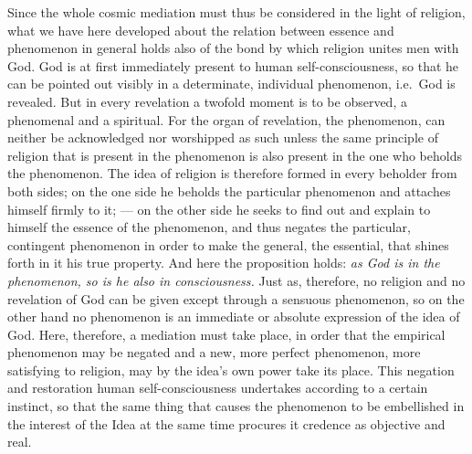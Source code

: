 \documentclass[12pt]{book}
\newcommand{\opage}[1]{\marginnote{\footnotesize\textit{[#1]}}}
\begin{document}
Since the whole cosmic mediation must thus be considered in the light of
religion, what we have here developed about the relation between essence and
phenomenon in general holds also of the bond by which religion unites men with
God. God is at first immediately present to human self-consciousness, so that
he can be pointed out visibly in a determinate, individual phenomenon, i.e.\
God is revealed. But in every revelation a twofold moment is to be observed, a
phenomenal and a spiritual. For the organ of revelation, the phenomenon, can
neither be acknowledged nor worshipped as such unless the same principle of
religion that is present in the phenomenon is also present in the one who
beholds the phenomenon. The idea of religion is therefore formed in every
beholder from both sides; on the one side he beholds the particular
phenomenon and attaches himself firmly to it; --- on the other side he seeks
to find out and explain to himself the essence of the phenomenon, and thus
negates the particular, contingent phenomenon in order to make the general,
the essential, that shines forth in it his true property. And here the
proposition holds: \emph{as God is in the phenomenon, so is he also in
consciousness.} Just as, therefore, no religion and no revelation of God can
be given except through a sensuous phenomenon, so on the other hand no
phenomenon is an immediate or absolute expression of the idea of God. Here,
therefore, a mediation must take place, in order that the empirical phenomenon
may be negated and a new, more perfect phenomenon, more satisfying to
religion, may by the idea's own power take its place. This negation and
restoration human self-consciousness undertakes according to a certain
instinct, so that
\opage{129} \setcounter{footnote}{0}%
the same thing that causes the phenomenon to be embellished in the interest of
the Idea at the same time procures it credence as objective and real.
\end{document}
